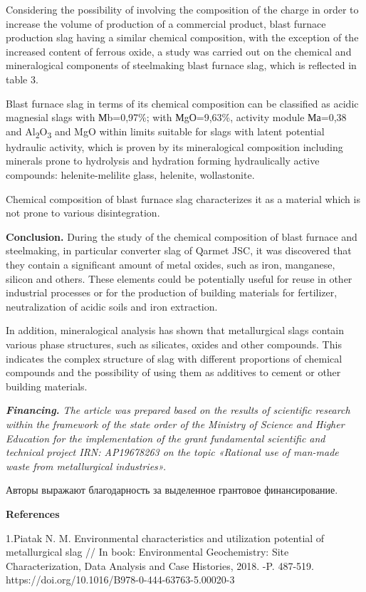 Considering the possibility of involving the composition of the charge
in order to increase the volume of production of a commercial product,
blast furnace production slag having a similar chemical composition,
with the exception of the increased content of ferrous oxide, a study
was carried out on the chemical and mineralogical components of
steelmaking blast furnace slag, which is reflected in table 3.

Blast furnace slag in terms of its chemical composition can be
classified as acidic magnesial slags with Мb=0,97\%; with МgО=9,63\%,
activity module Ма=0,38 and Al\textsubscript{2}O\textsubscript{3} and
MgO within limits suitable for slags with latent potential hydraulic
activity, which is proven by its mineralogical composition including
minerals prone to hydrolysis and hydration forming hydraulically active
compounds: helenite-melilite glass, helenite, wollastonite.

Chemical composition of blast furnace slag characterizes it as a
material which is not prone to various disintegration.

{\bfseries Conclusion.} During the study of the chemical composition of
blast furnace and steelmaking, in particular converter slag of Qarmet
JSC, it was discovered that they contain a significant amount of metal
oxides, such as iron, manganese, silicon and others. These elements
could be potentially useful for reuse in other industrial processes or
for the production of building materials for fertilizer, neutralization
of acidic soils and iron extraction.

In addition, mineralogical analysis has shown that metallurgical slags
contain various phase structures, such as silicates, oxides and other
compounds. This indicates the complex structure of slag with different
proportions of chemical compounds and the possibility of using them as
additives to cement or other building materials.

\emph{{\bfseries Financing.} The article was prepared based on the results
of scientific research within the framework of the state order of the
Ministry of Science and Higher Education for the implementation of the
grant fundamental scientific and technical project IRN: AP19678263 on
the topic «Rational use of man-made waste from metallurgical
industries».}

Авторы выражают благодарность за выделенное грантовое финансирование.

{\bfseries References}

1.Piatak N. M. Environmental characteristics and utilization potential
of metallurgical slag // In book: Environmental Geochemistry: Site
Characterization, Data Analysis and Case Histories, 2018. -P. 487-519.
https://doi.org/10.1016/B978-0-444-63763-5.00020-3

